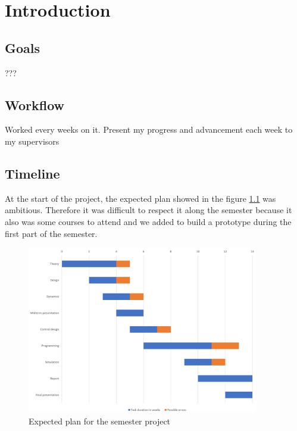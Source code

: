 \chapter{Introduction}
\label{sec:introduction}
\newpage



\section{Goals}
???

\section{Workflow}
Worked every weeks on it.
Present my progress and advancement each week to my supervisors
\section{Timeline}
At the start of the project, the expected plan showed in the figure \ref{pics:expectedGantt} was ambitious. Therefore it was difficult to respect it along the semester because it also was some courses to attend and we added to build a prototype during the first part of the semester.
\begin{figure}[h!]
   \centering
   \includegraphics[width=0.9\textwidth]{images/introduction/expectedGantt}
   \caption{Expected plan for the semester project}
   \label{pics:expectedGantt}
\end{figure}


